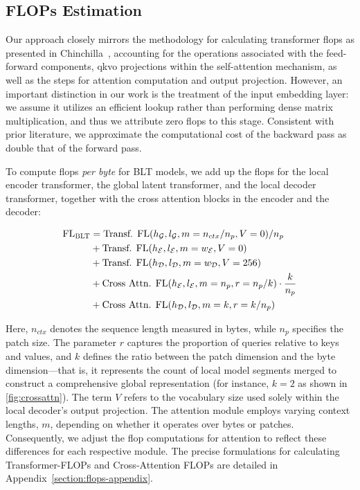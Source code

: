 \subsection{FLOPs Estimation} 
\label{section:flops}

Our approach closely mirrors the methodology for calculating transformer flops as presented in Chinchilla~\citep{hoffmann2022training}, accounting for the operations associated with the feed-forward components, qkvo projections within the self-attention mechanism, as well as the steps for attention computation and output projection. However, an important distinction in our work is the treatment of the input embedding layer: we assume it utilizes an efficient lookup rather than performing dense matrix multiplication, and thus we attribute zero flops to this stage. Consistent with prior literature, we approximate the computational cost of the backward pass as double that of the forward pass.

To compute flops \textit{per byte} for {\textsc BLT} models, we add up the flops for the local encoder transformer, the global latent transformer, and the local decoder transformer, together with the cross attention blocks in the encoder and the decoder:

\begin{align}
    \text{FL}_{\text{{\textsc BLT}}} &= \text{Transf. FL}(h_{\mathcal{G}}, l_{\mathcal{G}}, m=n_{ctx}/n_p, V=0) / n_p\\
   &+ \text{Transf. FL}(h_{\mathcal{E}}, l_{\mathcal{E}}, m=w_{\mathcal{E}}, V=0) \\
   &+ \text{Transf. FL}(h_{\mathcal{D}}, l_{\mathcal{D}}, m=w_{\mathcal{D}}, V=256) \\ 
    &+ \text{Cross Attn. FL}(h_{\mathcal{E}}, l_{\mathcal{E}}, m=n_p, r=n_p/k) \cdot \frac{k}{n_p} \\ 
   &+ \text{Cross Attn. FL}(h_{\mathcal{D}}, l_{\mathcal{D}}, m=k, r=k/n_p) 
\end{align}

Here, $n_{ctx}$ denotes the sequence length measured in bytes, while $n_p$ specifies the patch size. The parameter $r$ captures the proportion of queries relative to keys and values, and $k$ defines the ratio between the patch dimension and the byte dimension—that is, it represents the count of local model segments merged to construct a comprehensive global representation (for instance, $k=2$ as shown in \autoref{fig:crossattn}). The term $V$ refers to the vocabulary size used solely within the local decoder’s output projection. The attention module employs varying context lengths, $m$, depending on whether it operates over bytes or patches. Consequently, we adjust the flop computations for attention to reflect these differences for each respective module. The precise formulations for calculating Transformer-FLOPs and Cross-Attention FLOPs are detailed in Appendix~\ref{section:flops-appendix}.

